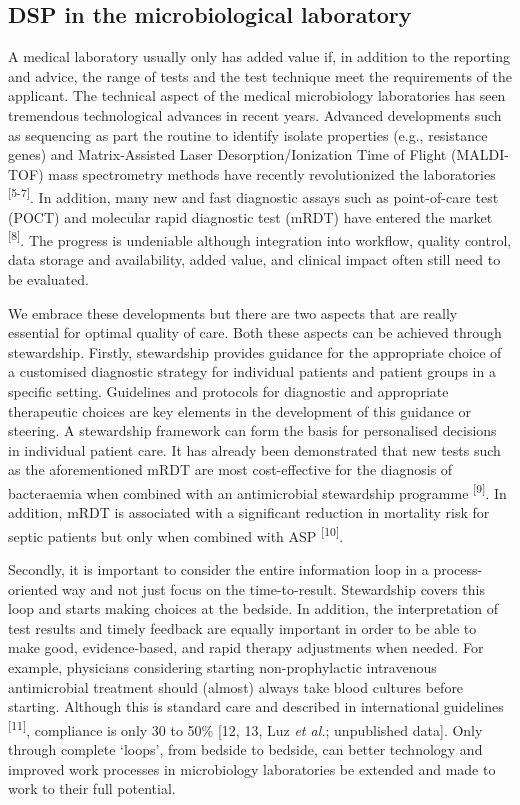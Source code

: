 \documentclass[
]{book}
\begin{document}
\hypertarget{dsp-in-the-microbiological-laboratory}{%
\subsection{DSP in the microbiological laboratory}\label{dsp-in-the-microbiological-laboratory}}

A medical laboratory usually only has added value if, in addition to the reporting and advice, the range of tests and the test technique meet the requirements of the applicant. The technical aspect of the medical microbiology laboratories has seen tremendous technological advances in recent years. Advanced developments such as sequencing as part the routine to identify isolate properties (e.g., resistance genes) and Matrix-Assisted Laser Desorption/Ionization Time of Flight (MALDI-TOF) mass spectrometry methods have recently revolutionized the laboratories \textsuperscript{{[}5-7{]}}. In addition, many new and fast diagnostic assays such as point-of-care test (POCT) and molecular rapid diagnostic test (mRDT) have entered the market \textsuperscript{{[}8{]}}. The progress is undeniable although integration into workflow, quality control, data storage and availability, added value, and clinical impact often still need to be evaluated.

We embrace these developments but there are two aspects that are really essential for optimal quality of care. Both these aspects can be achieved through stewardship. Firstly, stewardship provides guidance for the appropriate choice of a customised diagnostic strategy for individual patients and patient groups in a specific setting. Guidelines and protocols for diagnostic and appropriate therapeutic choices are key elements in the development of this guidance or steering. A stewardship framework can form the basis for personalised decisions in individual patient care. It has already been demonstrated that new tests such as the aforementioned mRDT are most cost-effective for the diagnosis of bacteraemia when combined with an antimicrobial stewardship programme \textsuperscript{{[}9{]}}. In addition, mRDT is associated with a significant reduction in mortality risk for septic patients but only when combined with ASP \textsuperscript{{[}10{]}}.

Secondly, it is important to consider the entire information loop in a process-oriented way and not just focus on the time-to-result. Stewardship covers this loop and starts making choices at the bedside. In addition, the interpretation of test results and timely feedback are equally important in order to be able to make good, evidence-based, and rapid therapy adjustments when needed. For example, physicians considering starting non-prophylactic intravenous antimicrobial treatment should (almost) always take blood cultures before starting. Although this is standard care and described in international guidelines \textsuperscript{{[}11{]}}, compliance is only 30 to 50\% {[}12, 13, Luz \emph{et al.}; unpublished data{]}. Only through complete `loops', from bedside to bedside, can better technology and improved work processes in microbiology laboratories be extended and made to work to their full potential.
\end{document}
